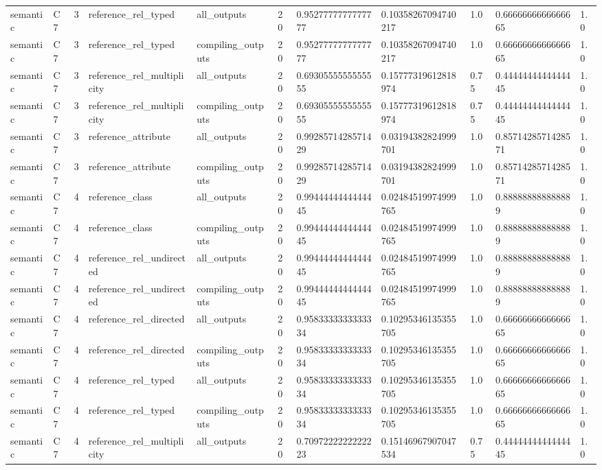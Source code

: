 \begin{tabular}{lllllllllll}
semantic & C7 & 3 & reference\_rel\_typed & all\_outputs & 20 & 0.9527777777777777 & 0.10358267094740217 & 1.0 & 0.6666666666666665 & 1.0 \\
semantic & C7 & 3 & reference\_rel\_typed & compiling\_outputs & 20 & 0.9527777777777777 & 0.10358267094740217 & 1.0 & 0.6666666666666665 & 1.0 \\
semantic & C7 & 3 & reference\_rel\_multiplicity & all\_outputs & 20 & 0.6930555555555555 & 0.15777319612818974 & 0.75 & 0.4444444444444445 & 1.0 \\
semantic & C7 & 3 & reference\_rel\_multiplicity & compiling\_outputs & 20 & 0.6930555555555555 & 0.15777319612818974 & 0.75 & 0.4444444444444445 & 1.0 \\
semantic & C7 & 3 & reference\_attribute & all\_outputs & 20 & 0.9928571428571429 & 0.03194382824999701 & 1.0 & 0.8571428571428571 & 1.0 \\
semantic & C7 & 3 & reference\_attribute & compiling\_outputs & 20 & 0.9928571428571429 & 0.03194382824999701 & 1.0 & 0.8571428571428571 & 1.0 \\
semantic & C7 & 4 & reference\_class & all\_outputs & 20 & 0.9944444444444445 & 0.02484519974999765 & 1.0 & 0.888888888888889 & 1.0 \\
semantic & C7 & 4 & reference\_class & compiling\_outputs & 20 & 0.9944444444444445 & 0.02484519974999765 & 1.0 & 0.888888888888889 & 1.0 \\
semantic & C7 & 4 & reference\_rel\_undirected & all\_outputs & 20 & 0.9944444444444445 & 0.02484519974999765 & 1.0 & 0.888888888888889 & 1.0 \\
semantic & C7 & 4 & reference\_rel\_undirected & compiling\_outputs & 20 & 0.9944444444444445 & 0.02484519974999765 & 1.0 & 0.888888888888889 & 1.0 \\
semantic & C7 & 4 & reference\_rel\_directed & all\_outputs & 20 & 0.9583333333333334 & 0.10295346135355705 & 1.0 & 0.6666666666666665 & 1.0 \\
semantic & C7 & 4 & reference\_rel\_directed & compiling\_outputs & 20 & 0.9583333333333334 & 0.10295346135355705 & 1.0 & 0.6666666666666665 & 1.0 \\
semantic & C7 & 4 & reference\_rel\_typed & all\_outputs & 20 & 0.9583333333333334 & 0.10295346135355705 & 1.0 & 0.6666666666666665 & 1.0 \\
semantic & C7 & 4 & reference\_rel\_typed & compiling\_outputs & 20 & 0.9583333333333334 & 0.10295346135355705 & 1.0 & 0.6666666666666665 & 1.0 \\
semantic & C7 & 4 & reference\_rel\_multiplicity & all\_outputs & 20 & 0.7097222222222223 & 0.15146967907047534 & 0.75 & 0.4444444444444445 & 1.0 \\

\end{tabular}
